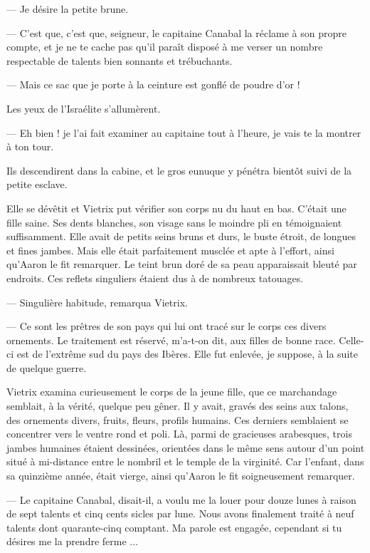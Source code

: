 \documentclass[a4paper, 11pt, oneside, polutonikogreek, french]{article}
\begin{document}
--- Je désire la petite brune.

--- C'est que, c'est que, seigneur, le capitaine Canabal la réclame à son propre compte, et je ne te cache pas qu'il paraît disposé à me verser un nombre respectable de talents bien sonnants et trébuchants.

--- Mais ce sac que je porte à la ceinture est gonflé de poudre d'or !

Les yeux de l'Israélite s'allumèrent.

--- Eh bien ! je l'ai fait examiner au capitaine tout à l'heure, je vais te la montrer à ton tour.

Ils descendirent dans la cabine, et le gros eunuque y pénétra bientôt suivi de la petite esclave.

Elle se dévêtit et Vietrix put vérifier son corps nu du haut en bas. C'était une fille saine. Ses dents blanches, son visage sans le moindre pli en témoignaient suffisamment. Elle avait de petits seins bruns et durs, le buste étroit, de longues et fines jambes. Mais elle était parfaitement musclée et apte à l'effort, ainsi qu'Aaron le fit remarquer. Le teint brun doré de sa peau apparaissait bleuté par endroits. Ces reflets singuliers étaient dus à de nombreux tatouages.

--- Singulière habitude, remarqua Vietrix.

--- Ce sont les prêtres de son pays qui lui ont tracé sur le corps ces divers ornements. Le traitement est réservé, m'a-t-on dit, aux filles de bonne race. Celle-ci est de l'extrême sud du pays des Ibères. Elle fut enlevée, je suppose, à la suite de quelque guerre.

Vietrix examina curieusement le corps de la jeune fille, que ce marchandage semblait, à la vérité, quelque peu gêner. Il y avait, gravés des seins aux talons, des ornements divers, fruits, fleurs, profils humains. Ces derniers semblaient se concentrer vers le ventre rond et poli. Là, parmi de gracieuses arabesques, trois jambes humaines étaient dessinées, orientées dans le même sens autour d'un point situé à mi-distance entre le nombril et le temple de la virginité. Car l'enfant, dans sa quinzième année, était vierge, ainsi qu'Aaron le fit soigneusement remarquer.

--- Le capitaine Canabal, disait-il, a voulu me la louer pour douze lunes à raison de sept talents et cinq cents sicles par lune. Nous avons finalement traité à neuf talents dont quarante-cinq comptant. Ma parole est engagée, cependant si tu désires me la prendre ferme ...
\end{document}
